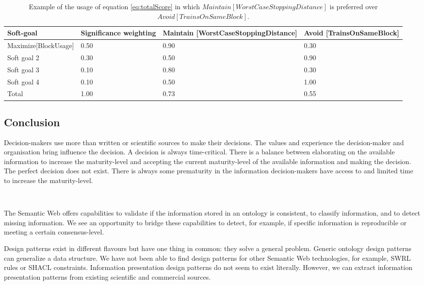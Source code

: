 \begin{table}[H]
\centering
\caption{Example of the usage of equation \ref{eq:totalScore} in which $Maintain[WorstCaseStoppingDistance]$ is preferred over $Avoid[TrainsOnSameBlock]$.}
\begin{tabular}{| p{4cm} | p{2cm} | p{4cm} | p{5cm} |}
\hline
\rowcolor{document}
\color{documentText}Soft-goal & \color{documentText} Significance weighting & \color{documentText}Maintain [WorstCaseStoppingDistance] & \color{documentText}Avoid [TrainsOnSameBlock] \\
\hline
Maximize[BlockUsage] & 0.50 & 0.90 & 0.30 \\
\hdashline
Soft goal 2 & 0.30 & 0.50 & 0.90 \\
\hdashline
Soft goal 3 & 0.10 & 0.80 & 0.30 \\
\hdashline
Soft goal 4 & 0.10 & 0.50 & 1.00 \\
\hline
Total & 1.00 & 0.73 & 0.55  \\
\hline
\end{tabular}
\label{table:itass_example}
\end{table}

\subsection{Conclusion} \label{tfconclusion}
Decision-makers use more than written or scientific sources to make their decisions. The values and experience the decision-maker and organisation bring influence the decision. A decision is always time-critical. There is a balance between elaborating on the available information to increase the maturity-level and accepting the current maturity-level of the available information and making the decision. The perfect decision does not exist. There is always some prematurity in the information decision-makers have access to and limited time to increase the maturity-level. 

\begin{center}
\large\color{document}{When decision-makers know the maturity-level, they can explicitly decide to spend more time to elaborate on the information or to make the decision based on the current maturity-level.} \\
\end{center}

The Semantic Web offers capabilities to validate if the information stored in an ontology is consistent, to classify information, and to detect missing information. We see an opportunity to bridge these capabilities to detect, for example, if specific information is reproducible or meeting a certain consensus-level. 

Design patterns exist in different flavours but have one thing in common: they solve a general problem. Generic ontology design patterns can generalize a data structure. We have not been able to find design patterns for other Semantic Web technologies, for example, SWRL rules or SHACL constraints. Information presentation design patterns do not seem to exist literally. However, we can extract information presentation patterns from existing scientific and commercial sources. 